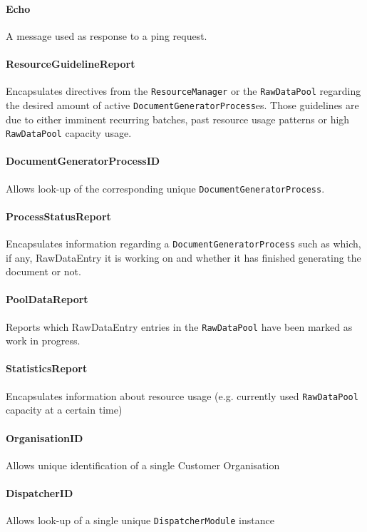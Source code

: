 \documentclass[a4paper,10pt]{article}
\begin{document}
\paragraph{Echo} A message used as response to a ping request.

\paragraph{ResourceGuidelineReport} Encapsulates directives from the \texttt{ResourceManager} or the \texttt{RawDataPool} regarding the desired amount of active \texttt{DocumentGeneratorProcess}es. Those guidelines are due to either imminent recurring batches, past resource usage patterns or high \texttt{RawDataPool} capacity usage.

\paragraph{DocumentGeneratorProcessID} Allows look-up of the corresponding unique \texttt{DocumentGeneratorProcess}.

\paragraph{ProcessStatusReport} Encapsulates information regarding a \texttt{DocumentGeneratorProcess} such as which, if any, RawDataEntry it is working on and whether it has finished generating the document or not.

\paragraph{PoolDataReport} Reports which RawDataEntry entries in the \texttt{RawDataPool} have been marked as work in progress.

\paragraph{StatisticsReport} Encapsulates information about resource usage (e.g. currently used \texttt{RawDataPool} capacity at a certain time)

\paragraph{OrganisationID} Allows unique identification of a single Customer Organisation

\paragraph{DispatcherID} Allows look-up of a single unique \texttt{DispatcherModule} instance 
\end{document}
